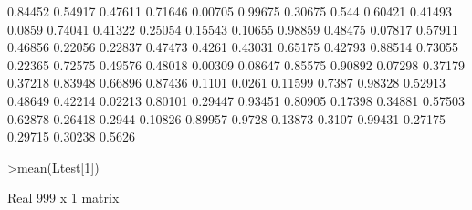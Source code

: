 \documentclass{article}
\newenvironment{eulernotebook}{\par}{\par}
\newenvironment{eulercomment}{\par\medskip}{\par\medskip}
\begin{document}
\begin{eulernotebook}
\begin{eulercomment}
\begin{eulercomment}
\begin{eulercomment}
\begin{eulercomment}
\begin{eulercomment}
\begin{eulercomment}
\begin{euleroutput}
              0.84452
              0.54917
              0.47611
              0.71646
              0.00705
              0.99675
              0.30675
                0.544
              0.60421
              0.41493
               0.0859
              0.74041
              0.41322
              0.25054
              0.15543
              0.10655
              0.98859
              0.48475
              0.07817
              0.57911
              0.46856
              0.22056
              0.22837
              0.47473
               0.4261
              0.43031
              0.65175
              0.42793
              0.88514
              0.73055
              0.22365
              0.72575
              0.49576
              0.48018
              0.00309
              0.08647
              0.85575
              0.90892
              0.07298
              0.37179
              0.37218
              0.83948
              0.66896
              0.87436
               0.1101
               0.0261
              0.11599
               0.7387
              0.98328
              0.52913
              0.48649
              0.42214
              0.02213
              0.80101
              0.29447
              0.93451
              0.80905
              0.17398
              0.34881
              0.57503
              0.62878
              0.26418
               0.2944
              0.10826
              0.89957
               0.9728
              0.13873
               0.3107
              0.99431
              0.27175
              0.29715
              0.30238
               0.5626
\end{euleroutput}
\begin{eulerprompt}
>mean(Ltest[1])
\end{eulerprompt}
\begin{euleroutput}
  Real 999 x 1 matrix
  

\end{euleroutput}
\end{eulercomment}
\end{eulercomment}
\end{eulercomment}
\end{eulercomment}
\end{eulercomment}
\end{eulercomment}
\end{eulernotebook}
\end{document}

